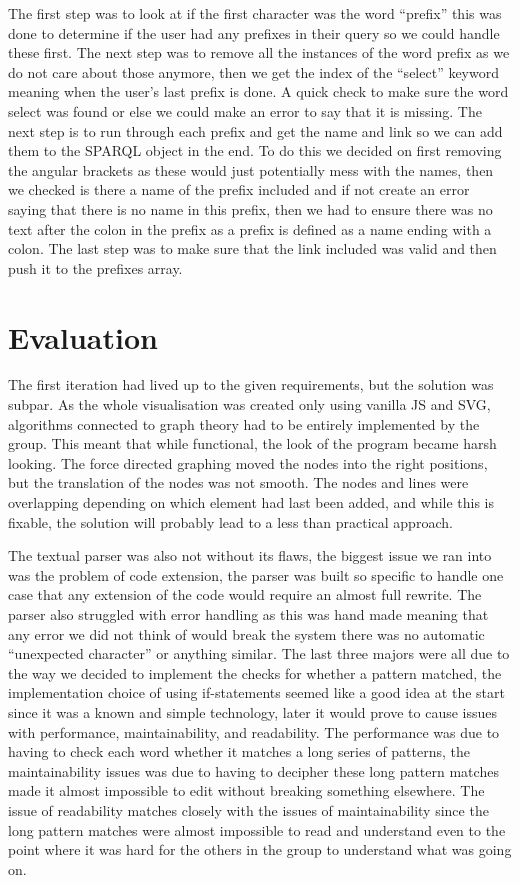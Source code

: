 The first step was to look at if the first character was the word “prefix” this was done to determine if the user had any prefixes in their query so we could handle these first. The next step was to remove all the instances of the word prefix as we do not care about those anymore, then we get the index of the “select” keyword meaning when the user’s last prefix is done. A quick check to make sure the word select was found or else we could make an error to say that it is missing. The next step is to run through each prefix and get the name and link so we can add them to the SPARQL object in the end. To do this we decided on first removing the angular brackets as these would just potentially mess with the names, then we checked is there a name of the prefix included and if not create an error saying that there is no name in this prefix, then we had to ensure there was no text after the colon in the prefix as a prefix is defined as a name ending with a colon. The last step was to make sure that the link included was valid and then push it to the prefixes array.

\section{Evaluation}
The first iteration had lived up to the given requirements, but the solution was subpar. As the whole visualisation was created only using vanilla JS and SVG, algorithms connected to graph theory had to be entirely implemented by the group. This meant that while functional, the look of the program became harsh looking. The force directed graphing moved the nodes into the right positions, but the translation of the nodes was not smooth. The nodes and lines were overlapping depending on which element had last been added, and while this is fixable, the solution will probably lead to a less than practical approach.

The textual parser was also not without its flaws, the biggest issue we ran into was the problem of code extension, the parser was built so specific to handle one case that any extension of the code would require an almost full rewrite. The parser also struggled with error handling as this was hand made meaning that any error we did not think of would break the system there was no automatic “unexpected character” or anything similar. The last three majors were all due to the way we decided to implement the checks for whether a pattern matched, the implementation choice of using if-statements seemed like a good idea at the start since it was a known and simple technology, later it would prove to cause issues with performance, maintainability, and readability. The performance was due to having to check each word whether it matches a long series of patterns, the maintainability issues was due to having to decipher these long pattern matches made it almost impossible to edit without breaking something elsewhere. The issue of readability matches closely with the issues of maintainability since the long pattern matches were almost impossible to read and understand even to the point where it was hard for the others in the group to understand what was going on.